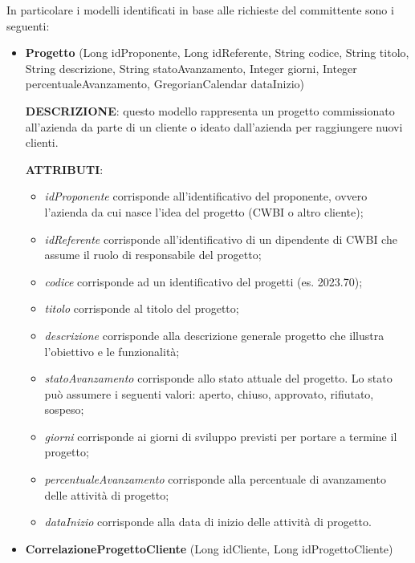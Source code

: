 \noindent In particolare i modelli identificati in base alle richieste del committente sono i seguenti:
\begin{itemize}
\item \textbf{Progetto} (Long idProponente, Long idReferente, String codice, String titolo, String descrizione, String statoAvanzamento, Integer giorni, Integer percentualeAvanzamento, GregorianCalendar dataInizio)

\setlength{\parskip}{3ex}

\noindent \textbf{DESCRIZIONE}: questo modello rappresenta un progetto commissionato all'azienda da parte di un cliente o ideato dall'azienda per raggiungere nuovi clienti.

\setlength{\parskip}{3ex}

\noindent \textbf{ATTRIBUTI}:
\begin{itemize}
\item \textit{idProponente} corrisponde all'identificativo del  proponente, ovvero l'azienda da cui nasce l'idea del progetto (CWBI o altro cliente);
\item \textit{idReferente} corrisponde all'identificativo di un dipendente di CWBI che assume il ruolo di responsabile del progetto;
\item \textit{codice} corrisponde ad un identificativo del progetti (es. 2023.70);
\item \textit{titolo} corrisponde al titolo del progetto;
\item \textit{descrizione} corrisponde alla descrizione generale  progetto che illustra l'obiettivo e le funzionalità;
\item \textit{statoAvanzamento} corrisponde allo stato attuale  del progetto. Lo stato può assumere i seguenti valori: {aperto, chiuso, approvato, rifiutato, sospeso};
\item \textit{giorni} corrisponde ai giorni di sviluppo previsti per portare a termine il progetto;
\item \textit{percentualeAvanzamento} corrisponde alla percentuale di avanzamento delle attività di progetto;
\item \textit{dataInizio} corrisponde alla data di inizio delle attività di progetto.
\end{itemize}

\setlength{\parskip}{6ex}

\item \textbf{CorrelazioneProgettoCliente} (Long idCliente, Long idProgettoCliente)

\setlength{\parskip}{3ex}


\end{itemize}
